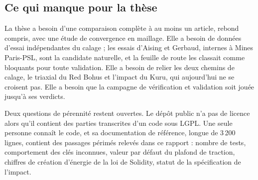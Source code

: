 \subsection{Ce qui manque pour la thèse}

La thèse a besoin d'une comparaison complète à au moins un article, rebond compris, avec une étude de convergence en maillage. Elle a besoin de données d'essai indépendantes du calage ; les essais d'Aising et Gerbaud, internes à Mines Paris-PSL, sont la candidate naturelle, et la feuille de route les classait comme bloquants pour toute validation. Elle a besoin de relier les deux chemins de calage, le triaxial du Red Bohus et l'impact du Kuru, qui aujourd'hui ne se croisent pas. Elle a besoin que la campagne de vérification et validation soit jouée jusqu'à ses verdicts.

Deux questions de pérennité restent ouvertes. Le dépôt public n'a pas de licence alors qu'il contient des parties transcrites d'un code sous LGPL. Une seule personne connaît le code, et sa documentation de référence, longue de 3\,200 lignes, contient des passages périmés relevés dans ce rapport : nombre de tests, comportement des clés inconnues, valeur par défaut du plafond de traction, chiffres de création d'énergie de la loi de Solidity, statut de la spécification de l'impact.
